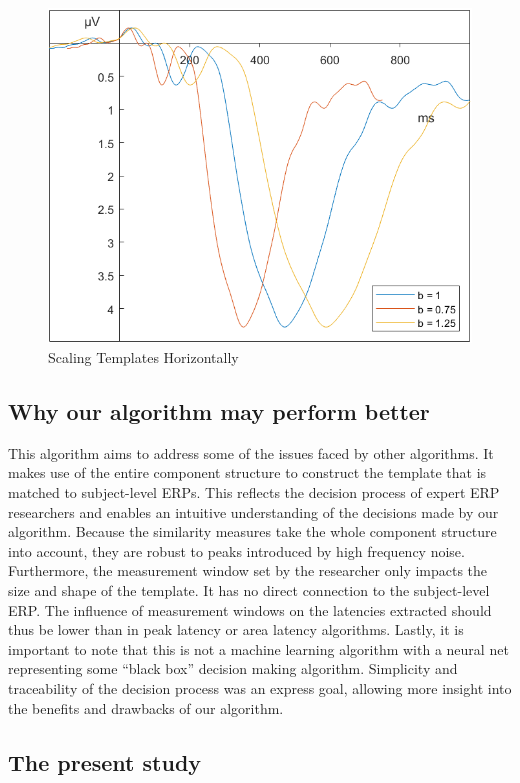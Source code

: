 \documentclass[
  man]{apa7}
\begin{document}
\begin{figure}
\includegraphics[width=0.75\linewidth]{images/b_scale} \caption{Scaling Templates Horizontally}\label{fig:b-scale-example}
\end{figure}

\hypertarget{why-our-algorithm-may-perform-better}{%
\subsection{Why our algorithm may perform better}\label{why-our-algorithm-may-perform-better}}

This algorithm aims to address some of the issues faced by other algorithms. It makes use of the entire component structure to construct the template that is matched to subject-level ERPs. This reflects the decision process of expert ERP researchers and enables an intuitive understanding of the decisions made by our algorithm. Because the similarity measures take the whole component structure into account, they are robust to peaks introduced by high frequency noise. Furthermore, the measurement window set by the researcher only impacts the size and shape of the template. It has no direct connection to the subject-level ERP. The influence of measurement windows on the latencies extracted should thus be lower than in peak latency or area latency algorithms. Lastly, it is important to note that this is not a machine learning algorithm with a neural net representing some ``black box'' decision making algorithm. Simplicity and traceability of the decision process was an express goal, allowing more insight into the benefits and drawbacks of our algorithm.

\hypertarget{the-present-study}{%
\subsection{The present study}\label{the-present-study}}
\end{document}
